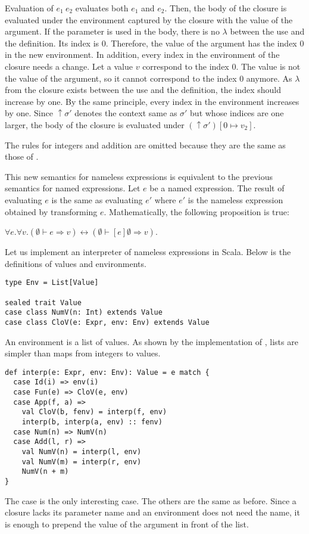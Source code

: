 Evaluation of $e_1\ e_2$ evaluates both $e_1$ and $e_2$. Then, the body of the
closure is evaluated under the environment captured by the closure with the value
of the argument. If the parameter is used in the body, there is no $\lambda$
between the use and the definition. Its index is 0. Therefore, the value of the
argument has the index 0 in the new environment. In addition, every index in the
environment of the closure needs a change. Let a value $v$ correspond to the
index 0. The value is not the value of the argument, so it cannot correspond to
the index 0 anymore. As $\lambda$ from the closure exists between the use and the
definition, the index should increase by one. By the same principle, every index
in the environment increases by one. Since $\uparrow\sigma'$ denotes the context
same as $\sigma'$ but whose indices are one larger, the body of the closure
is evaluated under $(\uparrow\sigma')[0\mapsto v_2]$.

The rules for integers and addition are omitted because they are the same as those
of \lang.

This new semantics for nameless expressions is equivalent to the previous
semantics for named expressions.
Let $e$ be a named expression. The result of evaluating $e$ is the same as
evaluating $e'$ where $e'$ is the nameless expression obtained by transforming $e$.
Mathematically, the following proposition is true:

$\forall e.\forall v.(\emptyset\vdash e\Rightarrow
v)\leftrightarrow(\emptyset\vdash[e]\emptyset\Rightarrow v)$.

Let us implement an interpreter of nameless expressions in Scala.
Below is the definitions of values and environments.

\begin{verbatim}
type Env = List[Value]

sealed trait Value
case class NumV(n: Int) extends Value
case class CloV(e: Expr, env: Env) extends Value
\end{verbatim}

An environment is a list of values. As shown by the implementation of
, lists are simpler than maps from integers to values.

\begin{verbatim}
def interp(e: Expr, env: Env): Value = e match {
  case Id(i) => env(i)
  case Fun(e) => CloV(e, env)
  case App(f, a) =>
    val CloV(b, fenv) = interp(f, env)
    interp(b, interp(a, env) :: fenv)
  case Num(n) => NumV(n)
  case Add(l, r) =>
    val NumV(n) = interp(l, env)
    val NumV(m) = interp(r, env)
    NumV(n + m)
}
\end{verbatim}

The  case is the only interesting case. The others are the same as
before. Since a closure lacks its parameter name and an environment does not need
the name, it is enough to prepend the value of the argument in front of the list.
